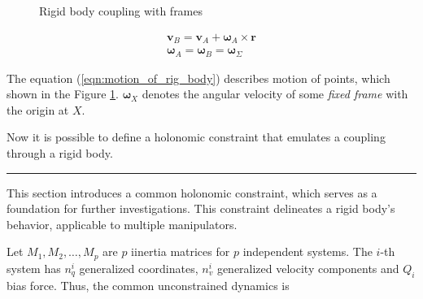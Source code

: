 \begin{figure}[H]
    \caption{Rigid body coupling with frames}
    \label{fig:coupling_rigid_body}
\end{figure}

\begin{equation}
    \begin{aligned}
        \mathbf{v}_B = \mathbf{v}_A + 
        \boldsymbol{\omega}_A \times \mathbf{r} \\
        \boldsymbol{\omega}_A = \boldsymbol{\omega}_B 
        = \boldsymbol{\omega}_{\Sigma}
    \end{aligned}
    \label{eqn:motion_of_rig_body}
\end{equation}

The equation (\ref{eqn:motion_of_rig_body}) describes motion of points, which 
shown in the Figure {\ref{fig:coupling_rigid_body}}. $\boldsymbol{\omega}_X$ 
denotes the angular velocity of some \emph{fixed frame} with the origin at $X$.

Now it is possible to define a holonomic constraint that emulates a coupling 
through a rigid body.

\noindent\rule{\textwidth}{1pt}

This section introduces a common holonomic constraint, which serves as a foundation 
for further investigations. This constraint delineates a rigid body's behavior, 
applicable to multiple manipulators.

Let $M_1, M_2, \dots, M_p$ are $p$ iinertia matrices for $p$ independent systems. 
The $i$-th system has $n_q^i$ generalized coordinates, $n_v^i$ generalized velocity 
components and $Q_i$ bias force. Thus, the common unconstrained dynamics is

